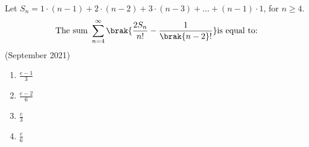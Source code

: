 \item Let $S_n = 1 \cdot (n-1) + 2 \cdot (n-2) + 3 \cdot (n-3) + \dots + (n-1) \cdot 1$, for $n \geq 4$.
\begin{align*} \text{The sum }
\sum_{n=4}^{\infty} \brak{\frac{2S_n}{n!} - \frac{1}{\brak{n-2}!}} \text{is equal to:}
\end{align*}\hfill (September 2021)
\begin{multicols}{2}
\begin{enumerate}
    \item $\frac{e-1}{3}$\\
    \item $\frac{e-2}{6}$
    \item $\frac{e}{3}$\\
    \item $\frac{e}{6}$
\end{enumerate}
\end{multicols}

